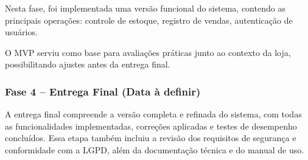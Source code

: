 Nesta fase, foi implementada uma versão funcional do sistema, contendo as principais operações: controle de estoque, registro de vendas, autenticação de usuários. 

O MVP serviu como base para avaliações práticas junto ao contexto da loja, possibilitando ajustes antes da entrega final.

\subsubsection{Fase 4 – Entrega Final (Data à definir)}

A entrega final compreende a versão completa e refinada do sistema, com todas as funcionalidades implementadas, correções aplicadas e testes de desempenho concluídos. Essa etapa também incluiu a revisão dos requisitos de segurança e conformidade com a LGPD, além da documentação técnica e do manual de uso.  

